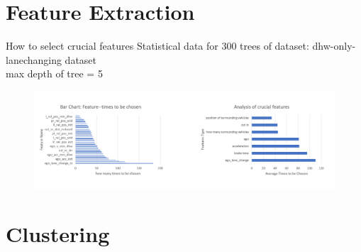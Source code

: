 \documentclass[shortpres]{beamer}
\begin{document}
\section{Feature Extraction}
\begin{frame}{How to select crucial features}
	Statistical data for 300 trees of dataset: dhw-only-lanechanging dataset\\max depth of tree = 5
	\begin{figure}
			\includegraphics[height=0.45\textheight]{fig_FeatureExtraction/StatisticallyAnalysis.png} 
	\end{figure}
\end{frame}


\section{Clustering}	
\end{document}
